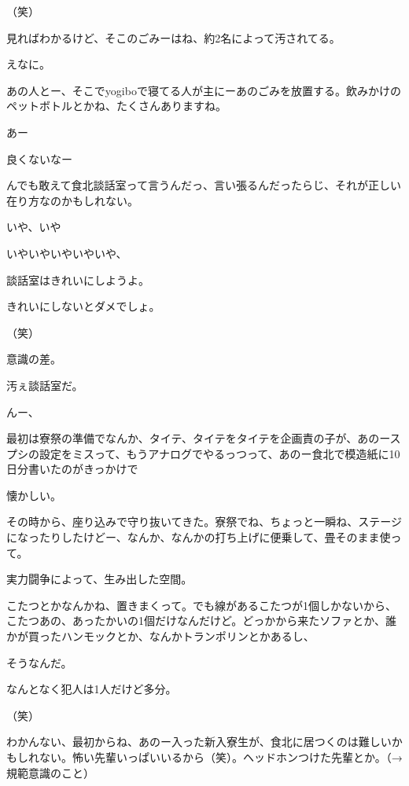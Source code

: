 \begin{multicols}{3}
{        （笑）

        見ればわかるけど、そこのごみーはね、約2名によって汚されてる。

        えなに。

        あの人とー、そこでyogiboで寝てる人が主にーあのごみを放置する。飲みかけのペットボトルとかね、たくさんありますね。

        あー

        良くないなー

        んでも敢えて食北談話室って言うんだっ、言い張るんだったらじ、それが正しい在り方なのかもしれない。

        いや、いや

        いやいやいやいやいや、

        談話室はきれいにしようよ。

        きれいにしないとダメでしょ。

        （笑）

        意識の差。

        汚ぇ談話室だ。

        んー、

        最初は寮祭の準備でなんか、タイテ、タイテをタイテを企画責の子が、あのースプシの設定をミスって、もうアナログでやるっつって、あのー食北で模造紙に10日分書いたのがきっかけで

        懐かしい。

        その時から、座り込みで守り抜いてきた。寮祭でね、ちょっと一瞬ね、ステージになったりしたけどー、なんか、なんかの打ち上げに便乗して、畳そのまま使って。

        実力闘争によって、生み出した空間。

        こたつとかなんかね、置きまくって。でも線があるこたつが1個しかないから、こたつあの、あったかいの1個だけなんだけど。どっかから来たソファとか、誰かが買ったハンモックとか、なんかトランポリンとかあるし、

        そうなんだ。

        なんとなく犯人は1人だけど多分。

        （笑）

        わかんない、最初からね、あのー入った新入寮生が、食北に居つくのは難しいかもしれない。怖い先輩いっぱいいるから（笑）。ヘッドホンつけた先輩とか。（→規範意識のこと）

}
\end{multicols}
